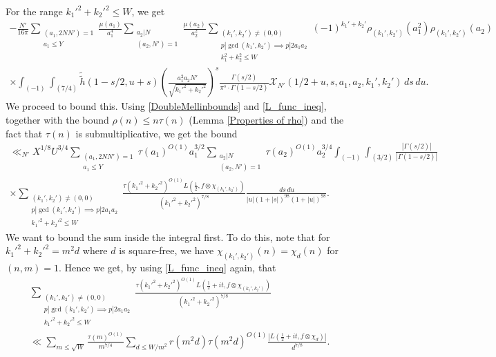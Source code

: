 \documentclass[12pt]{amsart}
\def\cX{\mathcal X}
\def\gcd{\operatorname{gcd}}
\begin{document}
For the range $k_1'^2+k_2'^2 \leq W$, we get
\begin{gather*}
 -\frac{N'}{16\pi} \sum_{\substack{(a_1,2NN')=1\\a_1\leq Y}}\frac{\mu(a_1)}{a_1^4}\sum_{\substack{a_2|N \\ (a_2,N')=1}}\frac{\mu(a_2)}{a_2^2}  \sum_{\substack{(k_1',k_2')\not=(0,0) \\ p | \gcd(k_1' ,k_2') \implies p|2a_1a_2 \\ k_1^2+k_2^2 \leq W}}(-1)^{k_1'+k_2'}\rho_{(k_1',k_2')}(a_1^2) \rho_{(k_1',k_2')}(a_2) \\
 \times \int_{(-1)} \int_{(7/4)} \tilde{\tilde{h}}(1-s/2,u+s) \left( \frac{a_1^2 a_2 N'}{\sqrt{k_1'^2+k_2'^2}} \right)^s \frac{ \Gamma(s/2)}{\pi^{s}\cdot \Gamma(1-s/2)} \cX_{N'}(1/2 + u, s, a_1,a_2,k_1',k_2')\, ds\, du. 
\end{gather*}
We proceed to bound this. 
Using \eqref{DoubleMellinbounds} and \eqref{L_func_ineq}, together with the bound $\rho(n)\leq n\tau(n)$ (Lemma \ref{Properties of rho}) and the fact that $\tau(n)$ is submultiplicative, we get the bound
\begin{gather*}
 \ll_{N'} X^{1/8} U^{3/4} \sum_{\substack{(a_1,2NN')=1\\a_1\leq Y}}\tau(a_1)^{O(1)} a_1^{3/2} \sum_{\substack{a_2|N \\ (a_2,N')=1}} \tau(a_2)^{O(1)}a_2^{3/4} \int_{(-1)} \int_{(3/2)} \frac{|\Gamma(s/2)|}{|\Gamma(1-s/2)|} \\
 \times \sum_{\substack{(k_1',k_2')\not=(0,0) \\ p | \gcd(k_1' ,k_2') \implies p|2a_1a_2 \\ k_1'^2+k_2'^2 \leq W}} \frac{\tau(k_1'^2+k_2'^2)^{O(1)}L(\frac{1}{2}, f \otimes \chi_{(k_1',k_2')}) }{(k_1'^2+k_2'^2)^{7/8}} \frac{\, ds\, du}{|u|(1+|s|)^{98}(1+|u|)^{98}} .
\end{gather*}
We want to bound the sum inside the integral first. To do this, note that for $k_1'^2+k_2'^2=m^2d$ where $d$ is square-free, we have $\chi_{(k_1',k_2')}(n) = \chi_d(n)$ for $(n,m)=1$. Hence we get, by using \eqref{L_func_ineq} again, that
\begin{gather*}
\sum_{\substack{(k_1',k_2')\not=(0,0) \\ p | \gcd(k_1' ,k_2') \implies p|2a_1a_2 \\ k_1'^2+k_2'^2 \leq W}} \frac{\tau(k_1'^2+k_2'^2)^{O(1)}  L(\frac{1}{2} + it, f\otimes \chi_{(k_1',k_2')}) }{(k_1'^2+k_2'^2)^{7/8}} \\
\ll \sum_{m \leq \sqrt{W}} \frac{\tau(m)^{O(1)}}{m^{7/4}} \sum_{d\leq W/m^2} r(m^2d) \tau(m^2 d)^{O(1)} \frac{|L(\frac{1}{2} + it, f \otimes \chi_d)|}{d^{7/8}}.
\end{gather*}
\end{document}
